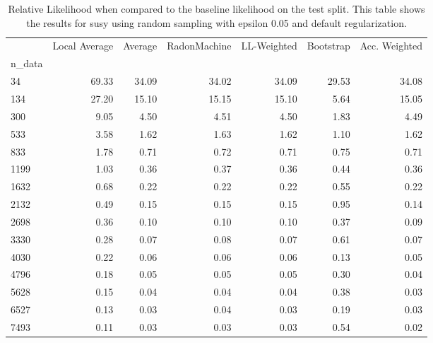 \begin{table}
\centering
\caption{Relative Likelihood when compared to the baseline likelihood on the test split. This table shows the results for  susy using  random sampling with epsilon  0.05 and  default regularization.}
\label{tab:9}
\begin{tabular}{lrrrrrr}
\toprule
{} &  Local Average &  Average &  RadonMachine &  LL-Weighted &  Bootstrap &  Acc. Weighted \\
n\_data &                &          &               &              &            &                \\
\midrule
34     &          69.33 &    34.09 &         34.02 &        34.09 &      29.53 &          34.08 \\
134    &          27.20 &    15.10 &         15.15 &        15.10 &       5.64 &          15.05 \\
300    &           9.05 &     4.50 &          4.51 &         4.50 &       1.83 &           4.49 \\
533    &           3.58 &     1.62 &          1.63 &         1.62 &       1.10 &           1.62 \\
833    &           1.78 &     0.71 &          0.72 &         0.71 &       0.75 &           0.71 \\
1199   &           1.03 &     0.36 &          0.37 &         0.36 &       0.44 &           0.36 \\
1632   &           0.68 &     0.22 &          0.22 &         0.22 &       0.55 &           0.22 \\
2132   &           0.49 &     0.15 &          0.15 &         0.15 &       0.95 &           0.14 \\
2698   &           0.36 &     0.10 &          0.10 &         0.10 &       0.37 &           0.09 \\
3330   &           0.28 &     0.07 &          0.08 &         0.07 &       0.61 &           0.07 \\
4030   &           0.22 &     0.06 &          0.06 &         0.06 &       0.13 &           0.05 \\
4796   &           0.18 &     0.05 &          0.05 &         0.05 &       0.30 &           0.04 \\
5628   &           0.15 &     0.04 &          0.04 &         0.04 &       0.38 &           0.03 \\
6527   &           0.13 &     0.03 &          0.04 &         0.03 &       0.19 &           0.03 \\
7493   &           0.11 &     0.03 &          0.03 &         0.03 &       0.54 &           0.02 \\
\bottomrule
\end{tabular}
\end{table}
